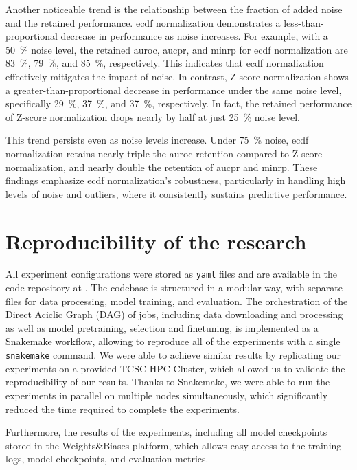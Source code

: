 Another noticeable trend is the relationship between the fraction of added noise and the retained performance. \gls{ecdf} normalization demonstrates a less-than-proportional decrease in performance as noise increases. For example, with a \qty{50}{\percent} noise level, the retained \gls{auroc}, \gls{aucpr}, and \gls{minrp} for \gls{ecdf} normalization are \qty{83}{\percent}, \qty{79}{\percent}, and \qty{85}{\percent}, respectively. This indicates that \gls{ecdf} normalization effectively mitigates the impact of noise. In contrast, Z-score normalization shows a greater-than-proportional decrease in performance under the same noise level, specifically \qty{29}{\percent}, \qty{37}{\percent}, and \qty{37}{\percent}, respectively. In fact, the retained performance of Z-score normalization drops nearly by half at just \qty{25}{\percent} noise level.

This trend persists even as noise levels increase. Under \qty{75}{\percent} noise, \gls{ecdf} normalization retains nearly triple the \gls{auroc} retention compared to Z-score normalization, and nearly double the retention of \gls{aucpr} and \gls{minrp}. These findings emphasize \gls{ecdf} normalization's robustness, particularly in handling high levels of noise and outliers, where it consistently sustains predictive performance.

\section{Reproducibility of the research}

All experiment configurations were stored as \texttt{yaml} files and are available in the code repository at . The codebase is structured in a modular way, with separate files for data processing, model training, and evaluation. The orchestration of the Direct Aciclic Graph (DAG) of jobs, including data downloading and processing as well as model pretraining, selection and finetuning, is implemented as a Snakemake workflow, allowing to reproduce all of the experiments with a single \texttt{snakemake} command. We were able to achieve similar results by replicating our experiments on a provided TCSC HPC Cluster, which allowed us to validate the reproducibility of our results. Thanks to Snakemake, we were able to run the experiments in parallel on multiple nodes simultaneously, which significantly reduced the time required to complete the experiments.

Furthermore, the results of the experiments, including all model checkpoints stored in the Weights\&Biases platform, which allows easy access to the training logs, model checkpoints, and evaluation metrics.



